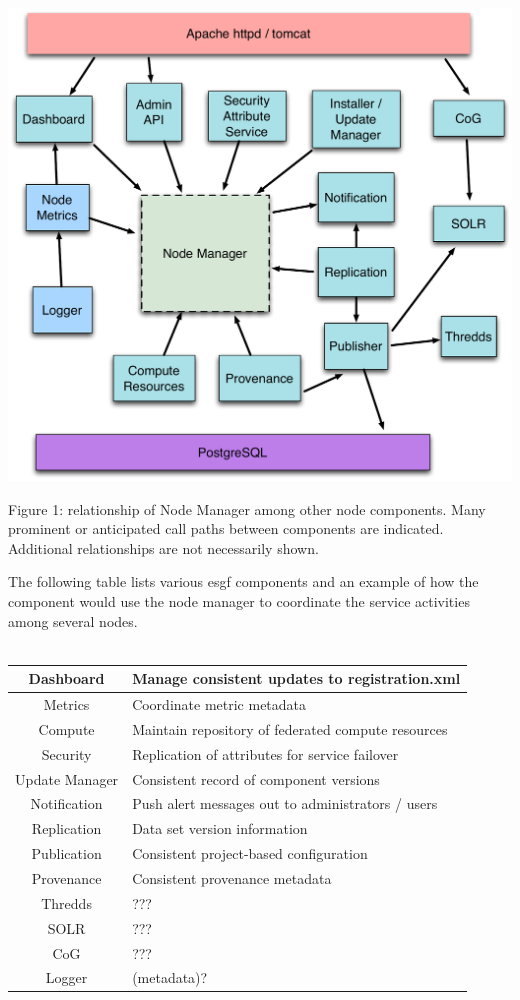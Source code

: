 \documentclass[oneside,12pt]{memoir}
\begin{document}
\begin{center}
\includegraphics[width=\textwidth]{presentation/ESGF-node-components.pdf}

Figure 1:  relationship of Node Manager among other node components.  Many prominent or anticipated call paths between components are indicated.  Additional relationships are not necessarily shown.  
\end{center}


The following table lists various esgf components and an example of how the component would use the node manager to coordinate the service activities among several nodes.  \\
\\

\begin{tabular}{|c|l|}
\hline
Dashboard &  Manage consistent updates to registration.xml \\
\hline
Metrics & Coordinate metric metadata \\
\hline
Compute & Maintain repository of federated compute resources \\
\hline
Security & Replication of attributes for service failover \\
\hline
Update Manager & Consistent record of component versions \\
\hline
Notification & Push alert messages out to administrators / users \\
\hline
Replication & Data set version information \\
\hline
Publication & Consistent project-based configuration \\
\hline
Provenance & Consistent provenance metadata \\
\hline
Thredds & ??? \\
\hline
SOLR & ??? \\
\hline
CoG & ??? \\
\hline
Logger & (metadata)? \\
\hline
\end{tabular}
\end{document}
